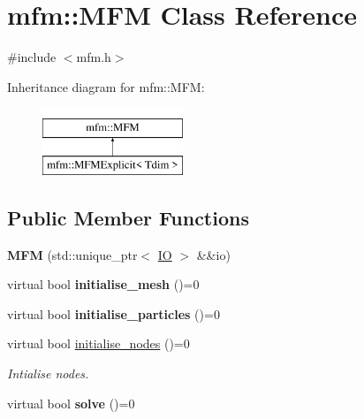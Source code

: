 \hypertarget{classmfm_1_1_m_f_m}{}\section{mfm\+:\+:M\+FM Class Reference}
\label{classmfm_1_1_m_f_m}


{\ttfamily \#include $<$mfm.\+h$>$}

Inheritance diagram for mfm\+:\+:M\+FM\+:\begin{figure}[H]
\begin{center}
\leavevmode
\includegraphics[height=2.000000cm]{classmfm_1_1_m_f_m}
\end{center}
\end{figure}
\subsection*{Public Member Functions}
\begin{DoxyCompactItemize}
\item 
\mbox{\label{classmfm_1_1_m_f_m_acd16d85bab80502144c6743078a3ea33}} 
{\bfseries M\+FM} (std\+::unique\+\_\+ptr$<$ \hyperlink{classmfm_1_1_i_o}{IO} $>$ \&\&io)
\item 
\mbox{\label{classmfm_1_1_m_f_m_a907d70cf1b581a589e1e6559cff52113}} 
virtual bool {\bfseries initialise\+\_\+mesh} ()=0
\item 
\mbox{\label{classmfm_1_1_m_f_m_aa5dcf9d73bcff53177a988911e30ec7d}} 
virtual bool {\bfseries initialise\+\_\+particles} ()=0
\item 
\mbox{\label{classmfm_1_1_m_f_m_a26cb73bacc6dad74e87ef4ab0fef1c14}} 
virtual bool \hyperlink{classmfm_1_1_m_f_m_a26cb73bacc6dad74e87ef4ab0fef1c14}{initialise\+\_\+nodes} ()=0
\begin{DoxyCompactList}\small\item\em Intialise nodes. \end{DoxyCompactList}\item 
\mbox{\label{classmfm_1_1_m_f_m_a0c824e2ab07dcdc96301a96df65090cd}} 
virtual bool {\bfseries solve} ()=0
\end{DoxyCompactItemize}
